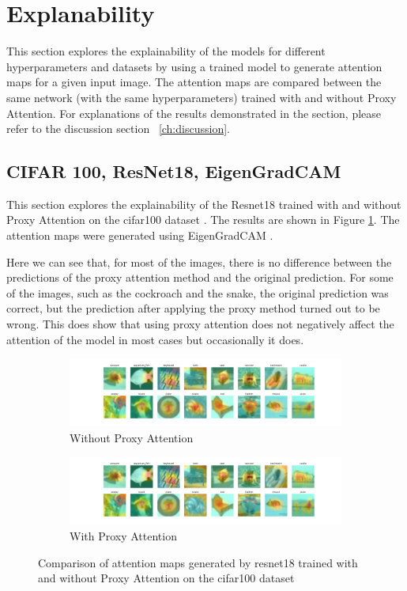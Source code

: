 \section{Explanability}
This section explores the explainability of the models for different hyperparameters and datasets by using a trained model to generate attention maps for a given input image. The attention maps are compared between the same network (with the same hyperparameters) trained with and without Proxy Attention. For explanations of the results demonstrated in the section, please refer to the discussion section ~\ref{ch:discussion}.

\subsection{CIFAR 100, ResNet18, EigenGradCAM}
This section explores the explainability of the Resnet18 \cite{heDeepResidualLearning2016} trained with and without Proxy Attention on the cifar100 dataset \cite{krizhevskyLearningMultipleLayers}. The results are shown in Figure \ref{fig:resnet18_cifar100}. The attention maps were generated using EigenGradCAM \cite{banymuhammadEigenCAMVisualExplanations2021}.

Here we can see that, for most of the images, there is no difference between the predictions of the proxy attention method and the original prediction. For some of the images, such as the cockroach and the snake, the original prediction was correct, but the prediction after applying the proxy method turned out to be wrong. This does show that using proxy attention does not negatively affect the attention of the model in most cases but occasionally it does. 

\begin{figure}[!htb]
    \begin{subfigure}[b]{1\textwidth}
        \includegraphics[width=\linewidth]{images/cifar100_resnet18_noproxy_0.pdf}
        \caption{Without Proxy Attention}
    \end{subfigure}
    \begin{subfigure}[b]{1\textwidth}
        \includegraphics[width=\linewidth]{images/cifar100_resnet18_proxy_0.pdf}
        \caption{With Proxy Attention}
    \end{subfigure}
    
    \caption{Comparison of attention maps generated by resnet18 trained with and without Proxy Attention on the cifar100 dataset}
    \label{fig:resnet18_cifar100}
\end{figure}


